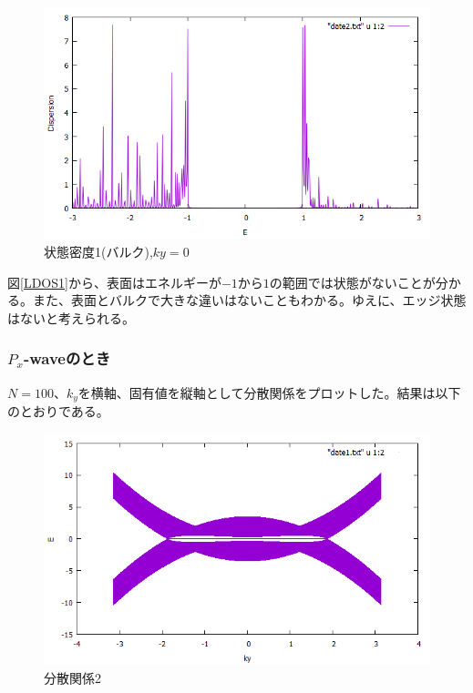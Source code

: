 \documentclass{jsarticle}
\begin{document}
            \begin{figure}[H]
                \centering
                \includegraphics[scale=0.5]{LDOSb_bry.png}
                \caption{状態密度1(バルク),$ky=0$}
                \label{LDOS1b}
            \end{figure}
    
            図\eqref{LDOS1}から、表面はエネルギーが$-1$から$1$の範囲では状態がないことが分かる。また、表面とバルクで大きな違いはないこともわかる。ゆえに、エッジ状態はないと考えられる。
    
            \subsubsection{$P_x$-waveのとき}
            $N=100$、$k_y$を横軸、固有値を縦軸として分散関係をプロットした。結果は以下のとおりである。
    
            \begin{figure}[H]
                \centering
                \includegraphics[scale=0.5]{BdG2_bry.png}
                \caption{分散関係2}
                \label{Dispersion2}
            \end{figure}
    
\end{document}
